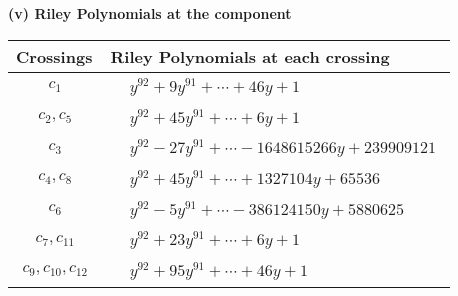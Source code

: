 \documentclass[1p]{elsarticle_modified}
\theoremstyle{definition}
\begin{document}
\newpage\renewcommand{\arraystretch}{1}
\flushleft \textbf{(v) Riley Polynomials at the component}\newline \\
\begin{tabular}{m{50pt}|m{274pt}}
Crossings & \hspace{64pt}Riley Polynomials at each crossing \\
\hline $$\begin{aligned}c_{1}\end{aligned}$$&$\begin{aligned}
&y^{92}+9 y^{91}+\cdots+46 y+1
\end{aligned}$\\
\hline $$\begin{aligned}c_{2},c_{5}\end{aligned}$$&$\begin{aligned}
&y^{92}+45 y^{91}+\cdots+6 y+1
\end{aligned}$\\
\hline $$\begin{aligned}c_{3}\end{aligned}$$&$\begin{aligned}
&y^{92}-27 y^{91}+\cdots-1648615266 y+239909121
\end{aligned}$\\
\hline $$\begin{aligned}c_{4},c_{8}\end{aligned}$$&$\begin{aligned}
&y^{92}+45 y^{91}+\cdots+1327104 y+65536
\end{aligned}$\\
\hline $$\begin{aligned}c_{6}\end{aligned}$$&$\begin{aligned}
&y^{92}-5 y^{91}+\cdots-386124150 y+5880625
\end{aligned}$\\
\hline $$\begin{aligned}c_{7},c_{11}\end{aligned}$$&$\begin{aligned}
&y^{92}+23 y^{91}+\cdots+6 y+1
\end{aligned}$\\
\hline $$\begin{aligned}c_{9},c_{10},c_{12}\end{aligned}$$&$\begin{aligned}
&y^{92}+95 y^{91}+\cdots+46 y+1
\end{aligned}$\\
\hline
\end{tabular}\\~\\
\end{document}
